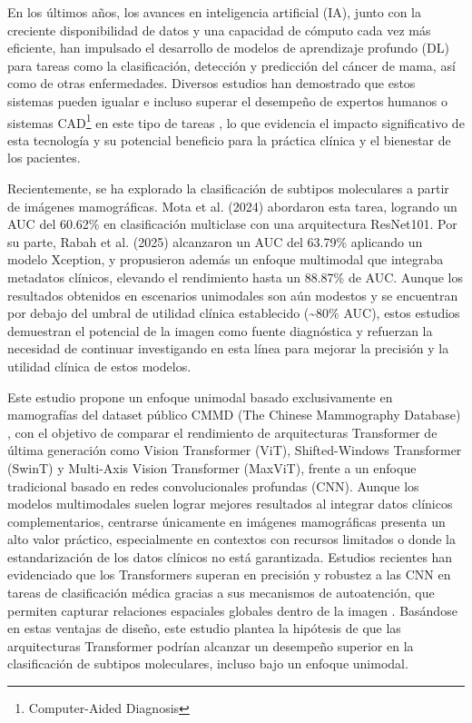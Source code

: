 \documentclass[a4paper,10pt]{book}
\begin{document}
En los últimos años, los avances en inteligencia artificial (IA), junto con la creciente disponibilidad de datos y una capacidad de cómputo cada vez más eficiente, han impulsado el desarrollo de modelos de aprendizaje profundo (DL) para tareas como la clasificación, detección y predicción del cáncer de mama, así como de otras enfermedades. Diversos estudios han demostrado que estos sistemas pueden igualar e incluso superar el desempeño de expertos humanos o sistemas CAD\footnote{Computer-Aided Diagnosis} en este tipo de tareas \cite{mckinney_international_2020,pattanaik_breast_2022,meenalochini_deep_2024,hussain_performance_2025}, lo que evidencia el impacto significativo de esta tecnología y su potencial beneficio para la práctica clínica y el bienestar de los pacientes.

Recientemente, se ha explorado la clasificación de subtipos moleculares a partir de imágenes mamográficas. Mota et al. (2024) \cite{mota_breast_2024} abordaron esta tarea, logrando un AUC del 60.62\% en clasificación multiclase con una arquitectura ResNet101. Por su parte, Rabah et al. (2025) \cite{ben_rabah_multimodal_2025} alcanzaron un AUC del 63.79\% aplicando un modelo Xception, y propusieron además un enfoque multimodal que integraba metadatos clínicos, elevando el rendimiento hasta un 88.87\% de AUC. Aunque los resultados obtenidos en escenarios unimodales son aún modestos y se encuentran por debajo del umbral de utilidad clínica establecido (\textasciitilde80\% AUC), estos estudios demuestran el potencial de la imagen como fuente diagnóstica y refuerzan la necesidad de continuar investigando en esta línea para mejorar la precisión y la utilidad clínica de estos modelos.

Este estudio propone un enfoque unimodal basado exclusivamente en mamografías del dataset público CMMD (The Chinese Mammography Database) \cite{cai_online_2023}, con el objetivo de comparar el rendimiento de arquitecturas Transformer de última generación como Vision Transformer (ViT), Shifted-Windows Transformer (SwinT) y Multi-Axis Vision Transformer (MaxViT), frente a un enfoque tradicional basado en redes convolucionales profundas (CNN). Aunque los modelos multimodales suelen lograr mejores resultados al integrar datos clínicos complementarios, centrarse únicamente en imágenes mamográficas presenta un alto valor práctico, especialmente en contextos con recursos limitados o donde la estandarización de los datos clínicos no está garantizada. Estudios recientes han evidenciado que los Transformers superan en precisión y robustez a las CNN en tareas de clasificación médica gracias a sus mecanismos de autoatención, que permiten capturar relaciones espaciales globales dentro de la imagen \cite{mauricio_comparing_2023}. Basándose en estas ventajas de diseño, este estudio plantea la hipótesis de que las arquitecturas Transformer podrían alcanzar un desempeño superior en la clasificación de subtipos moleculares, incluso bajo un enfoque unimodal.
\end{document}
